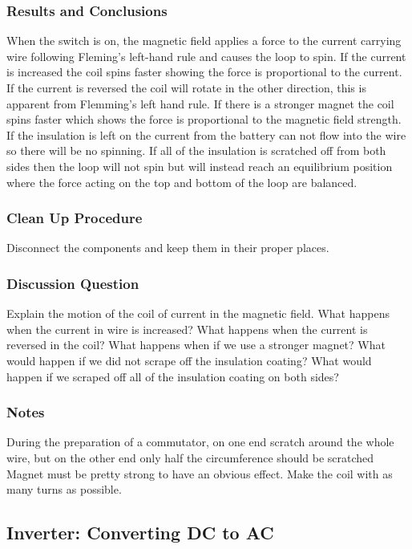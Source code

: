 \subsubsection*{Results and Conclusions}
When the switch is on, the magnetic field applies a force to the current carrying wire following Fleming's left-hand rule and causes the loop to spin. If the current is increased the coil spins faster showing the force is proportional to the current. If the current is reversed the coil will rotate in the other direction, this is apparent from Flemming's left hand rule. If there is a stronger magnet the coil spins faster which shows the force is proportional to the magnetic field strength. If the insulation is left on the current from the battery can not flow into the wire so there will be no spinning. If all of the insulation is scratched off from both sides then the loop will not spin but will instead reach an equilibrium position where the force acting on the top and bottom of the loop are balanced.  

\subsubsection*{Clean Up Procedure}
Disconnect the components and keep them in their proper places.

\subsubsection*{Discussion Question}
Explain the motion of the coil of current in the magnetic field. What happens when the current in wire is increased? What happens when the current is reversed in the coil? What happens when if we use a stronger magnet? What would happen if we did not scrape off the insulation coating? What would happen if we scraped off all of the insulation coating on both sides?

\subsubsection*{Notes}
During the preparation of a commutator, on one end scratch around the whole wire, but on the other end only half the circumference should be scratched
Magnet must be pretty strong to have an obvious effect. Make the coil with as many turns as possible. 



\subsection{Inverter: Converting DC to AC} %

